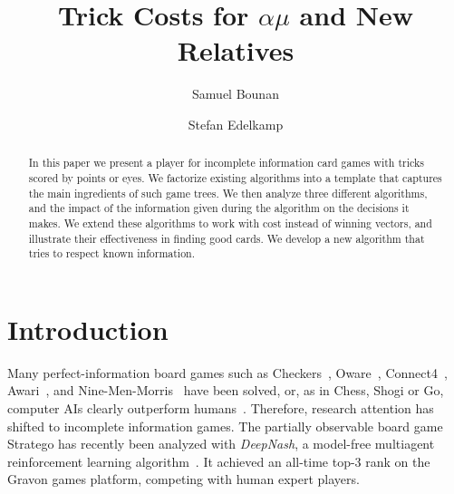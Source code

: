 \documentclass[runningheads]{llncs}
\begin{document}
%
\title{Trick Costs for $\alpha\mu$ and New Relatives
}
%
%
\author{Samuel Bounan \and
Stefan Edelkamp}
%
%
%
\maketitle              %
%
\begin{abstract}
In this paper we present a player for incomplete information
card games with tricks scored by points or eyes. We factorize existing algorithms into a template that captures the main ingredients of such game trees. We then analyze three different algorithms, and the impact of the information given during the algorithm on the decisions it makes. We extend these algorithms to work with cost instead of winning vectors, and illustrate their effectiveness in finding good cards. We develop a new algorithm that tries to respect known information.

\end{abstract}
%
%
%
\section{Introduction}

Many perfect-information board games such as Checkers~\cite{checkers}, Oware~\cite{Oware}, Connect4~\cite{connectfour}, Awari~\cite{DBLP:journals/computer/RomeinB03}, and Nine-Men-Morris~\cite{ninemenmorris} have been solved, or, as in Chess, Shogi or Go, computer AIs clearly outperform humans~\cite{alphazero}. 
Therefore, research attention has shifted to incomplete information games. The partially observable board game Stratego
has recently been analyzed with \emph{DeepNash}, a model-free multiagent reinforcement learning algorithm~\cite{Perolat_2022}. It achieved an all-time top-3 rank on the Gravon games platform, competing with human expert players. 
\end{document}
